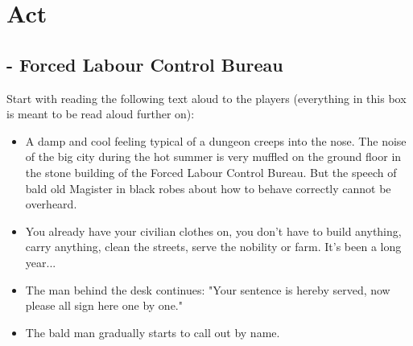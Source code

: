 \documentclass[10pt,onecolumn,twoside,openany,bg=full,layout=true]{dndbook}
\begin{document}
\setcounter{act_num}{1}

\section{Act }\label{sec:act-\roman{act_num}}
\addtocounter{act_num}{1}

\setcounter{subact_num}{1}
\subsection{ - Forced Labour Control Bureau}\label{subsec:\arabic{subact_num}-forced-labour-control-bureau}
\addtocounter{subact_num}{1}

Start with reading the following text aloud to the players (everything in this box is meant to be read aloud further on):
\begin{DndReadAloud}
\begin{itemize}
\item A damp and cool feeling typical of a dungeon creeps into the nose.
The noise of the big city during the hot summer is very muffled on the ground floor in the stone building of the Forced Labour Control Bureau.
But the speech of bald old Magister in black robes about how to behave correctly cannot be overheard.
\item You already have your civilian clothes on, you don't have to build anything, carry anything, clean the streets,
serve the nobility or farm.
It's been a long year...
\item The man behind the desk continues:
"Your sentence is hereby served, now please all sign here one by one."
\item The bald man gradually starts to call out by name.
\end{itemize}
\end{DndReadAloud}
\end{document}
